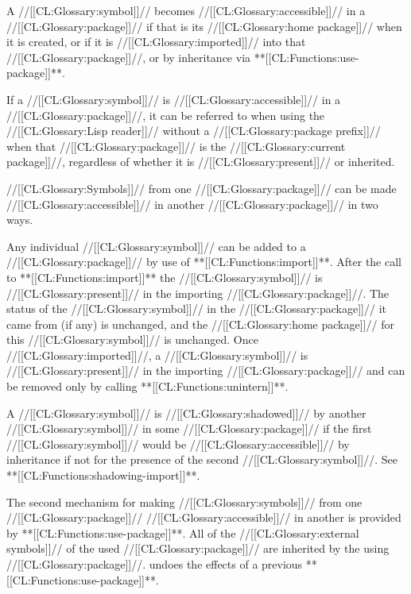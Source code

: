 \endsubsubsubsection%


A //[[CL:Glossary:symbol]]// becomes //[[CL:Glossary:accessible]]// in a //[[CL:Glossary:package]]// 
    if that is its //[[CL:Glossary:home package]]// when it is created,
 or if it is //[[CL:Glossary:imported]]// into that //[[CL:Glossary:package]]//,
 or by inheritance via **[[CL:Functions:use-package]]**.

If a //[[CL:Glossary:symbol]]// is //[[CL:Glossary:accessible]]// in a //[[CL:Glossary:package]]//,
it can be referred to when using the //[[CL:Glossary:Lisp reader]]//
without a //[[CL:Glossary:package prefix]]// when that //[[CL:Glossary:package]]// is the //[[CL:Glossary:current package]]//,
regardless of whether it is //[[CL:Glossary:present]]// or inherited.







//[[CL:Glossary:Symbols]]// from one //[[CL:Glossary:package]]// can be made //[[CL:Glossary:accessible]]// 
in another //[[CL:Glossary:package]]// in two ways.


\beginlist 
\itemitem{--}
Any individual //[[CL:Glossary:symbol]]// can be added to a //[[CL:Glossary:package]]// by use
of **[[CL:Functions:import]]**.  After the call to **[[CL:Functions:import]]** the
//[[CL:Glossary:symbol]]// is //[[CL:Glossary:present]]// in the importing //[[CL:Glossary:package]]//.
The status of the //[[CL:Glossary:symbol]]// in the //[[CL:Glossary:package]]// 
it came from (if any) is unchanged, and the //[[CL:Glossary:home package]]// for
this //[[CL:Glossary:symbol]]// is unchanged.
Once //[[CL:Glossary:imported]]//, a //[[CL:Glossary:symbol]]// is //[[CL:Glossary:present]]// in the
importing //[[CL:Glossary:package]]//
and can be removed only by calling **[[CL:Functions:unintern]]**.


A //[[CL:Glossary:symbol]]// is //[[CL:Glossary:shadowed]]// by another //[[CL:Glossary:symbol]]// 
in some //[[CL:Glossary:package]]// if the first //[[CL:Glossary:symbol]]// would be //[[CL:Glossary:accessible]]//
by inheritance if not for the presence of the second //[[CL:Glossary:symbol]]//.
See **[[CL:Functions:shadowing-import]]**.



\itemitem{--}
The second mechanism for making //[[CL:Glossary:symbols]]// from one //[[CL:Glossary:package]]//
//[[CL:Glossary:accessible]]// in another is provided by **[[CL:Functions:use-package]]**.  
All of the //[[CL:Glossary:external symbols]]// of the used //[[CL:Glossary:package]]// are inherited
by the using //[[CL:Glossary:package]]//.
 undoes the effects of a previous **[[CL:Functions:use-package]]**.  
\endlist

